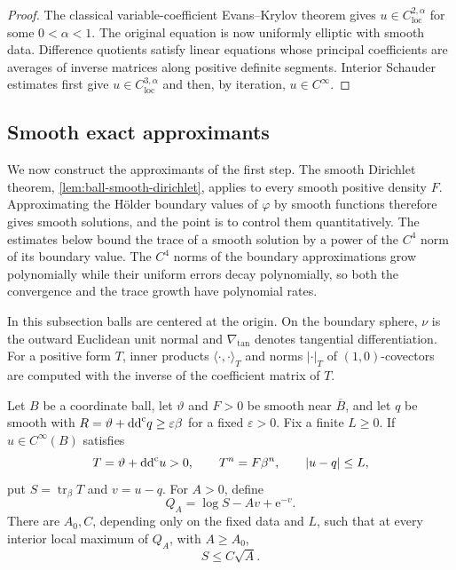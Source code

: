 \begin{proof}
The classical variable-coefficient Evans--Krylov theorem gives $u\in C^{2,\alpha}_{\mathrm{loc}}$ for some $0<\alpha<1$. The original equation is now uniformly elliptic with smooth data. Difference quotients satisfy linear equations whose principal coefficients are averages of inverse matrices along positive definite segments. Interior Schauder estimates first give $u\in C^{3,\alpha}_{\mathrm{loc}}$ and then, by iteration, $u\in C^\infty$.
\end{proof}

\subsection{Smooth exact approximants}\label{sec:interior-approximants}

We now construct the approximants of the first step. The smooth Dirichlet theorem, \cref{lem:ball-smooth-dirichlet}, applies to every smooth positive density $F$. Approximating the H\"older boundary values of $\varphi$ by smooth functions therefore gives smooth solutions, and the point is to control them quantitatively. The estimates below bound the trace of a smooth solution by a power of the $C^4$ norm of its boundary value. The $C^4$ norms of the boundary approximations grow polynomially while their uniform errors decay polynomially, so both the convergence and the trace growth have polynomial rates.

In this subsection balls are centered at the origin. On the boundary sphere, $\nu$ is the outward Euclidean unit normal and $\nabla_{\tan}$ denotes tangential differentiation. For a positive form $T$, inner products $\langle\cdot,\cdot\rangle_T$ and norms $|\cdot|_T$ of $(1,0)$-covectors are computed with the inverse of the coefficient matrix of $T$.

\begin{lemma}\label{lem:interior-trace-peak}
Let $B$ be a coordinate ball, let $\vartheta$ and $F>0$ be smooth near $\overline B$, and let $q$ be smooth with $R=\vartheta+\mathrm{dd}^{\mathrm{c}} q\geq\varepsilon\beta$ for a fixed $\varepsilon>0$. Fix a finite $L\geq0$. If $u\in C^\infty(B)$ satisfies
\[
  T=\vartheta+\mathrm{dd}^{\mathrm{c}} u>0,
  \qquad T^n=F\beta^n,
  \qquad |u-q|\leq L,
\]
put $S=\operatorname{tr}_\beta T$ and $v=u-q$. For $A>0$, define
\[
  Q_A=\log S-Av+\mathrm{e}^{-v}.
\]
There are $A_0,C$, depending only on the fixed data and $L$, such that at every interior local maximum of $Q_A$, with $A\geq A_0$,
\begin{equation}\label{eq:interior-trace-peak}
  S\leq C\sqrt A.
\end{equation}
\end{lemma}

